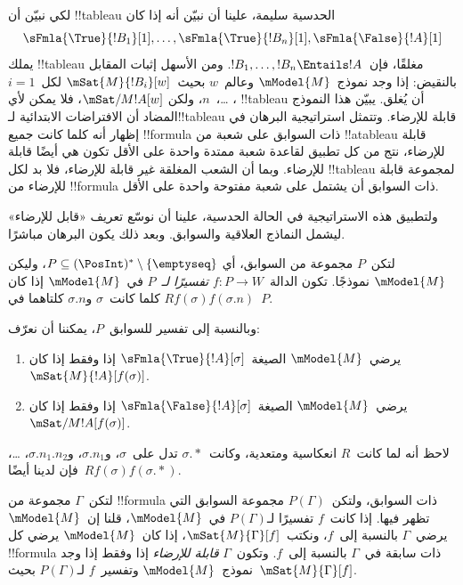 \documentclass[../../../include/open-logic-section]{subfiles}
\begin{document}


\begin{explain}
  لكي نبيّن أن !!{tableau} الحدسية سليمة، علينا أن نبيّن أنه إذا كان
  \[
  \sFmla{\True}{!B_1}[1], \dots, \sFmla{\True}{!B_n}[1], \sFmla{\False}{!A}[1]
  \]
  يملك !!{tableau} مغلقًا، فإن~$!B_1, \dots, !B_n \Entails !A$.
  ومن الأسهل إثبات المقابل بالنقيض: إذا وجد نموذج~$\mModel{M}$ وعالم~$w$
  بحيث~$\mSat{M}{!B_i}[w]$ لكل~$i=1$، \dots،~$n$، ولكن
  $\mSat/{M}{!A}[w]$، فلا يمكن لأي !!{tableau} أن يُغلق. يبيّن هذا
  النموذج المضاد أن الافتراضات الابتدائية لـ!!{tableau} قابلة للإرضاء.
  وتتمثل استراتيجية البرهان في إظهار أنه كلما كانت جميع !!{formula}
  ذات السوابق على شعبة من !!a{tableau} قابلة للإرضاء، نتج من كل تطبيق
  لقاعدة شعبة ممتدة واحدة على الأقل تكون هي أيضًا قابلة للإرضاء. وبما أن
  الشعب المغلقة غير قابلة للإرضاء، فلا بد لكل !!{tableau} لمجموعة قابلة
  للإرضاء من !!{formula} ذات السوابق أن يشتمل على شعبة مفتوحة واحدة
  على الأقل.

  ولتطبيق هذه الاستراتيجية في الحالة الحدسية، علينا أن نوسّع تعريف
  «قابل للإرضاء» ليشمل النماذج العلاقية والسوابق. وبعد ذلك يكون البرهان
  مباشرًا.
\end{explain}

\begin{defn}
  لتكن~$P$ مجموعة من السوابق، أي
  $P \subseteq (\PosInt)^* \setminus \{\emptyseq\}$، وليكن
  $\mModel{M}$ نموذجًا. تكون الدالة~$f\colon P \to W$
  \emph{تفسيرًا لـ}~$P$ في~$\mModel{M}$ إذا كان
  $Rf(\sigma)f(\sigma.n)$ كلما كانت~$\sigma$ و$\sigma.n$
  كلتاهما في~$P$.

  وبالنسبة إلى تفسير للسوابق~$P$، يمكننا أن نعرّف:
  \begin{enumerate}
  \item يرضي~$\mModel{M}$ الصيغة~$\sFmla{\True}{!A}[\sigma]$ إذا وفقط
    إذا كان~$\mSat{M}{!A}[f(\sigma)]$.
  \item يرضي~$\mModel{M}$ الصيغة~$\sFmla{\False}{!A}[\sigma]$ إذا وفقط
    إذا كان~$\mSat/{M}{!A}[f(\sigma)]$.
  \end{enumerate}
\end{defn}

لاحظ أنه لما كانت~$R$ انعكاسية ومتعدية، وكانت~$\sigma.{*}$ تدل
على~$\sigma$، و$\sigma.n_1$، و$\sigma.n_1.n_2$، \dots، فإن لدينا
أيضًا~$Rf(\sigma)f(\sigma.{*})$.

\begin{defn}
  لتكن~$\Gamma$ مجموعة من !!{formula} ذات السوابق، ولتكن~$P(\Gamma)$
  مجموعة السوابق التي تظهر فيها. إذا كانت~$f$ تفسيرًا لـ$P(\Gamma)$
  في~$\mModel{M}$، قلنا إن~$\mModel{M}$ يرضي~$\Gamma$ بالنسبة إلى~$f$،
  ونكتب~$\mSat{M}{\Gamma}[f]$، إذا كان~$\mModel{M}$ يرضي كل
  !!{formula} ذات سابقة في~$\Gamma$ بالنسبة إلى~$f$. وتكون~$\Gamma$
  \emph{قابلة للإرضاء} إذا وفقط إذا وجد نموذج~$\mModel{M}$ وتفسير~$f$
  لـ$P(\Gamma)$ بحيث~$\mSat{M}{\Gamma}[f]$.
\end{defn}
\end{document}
